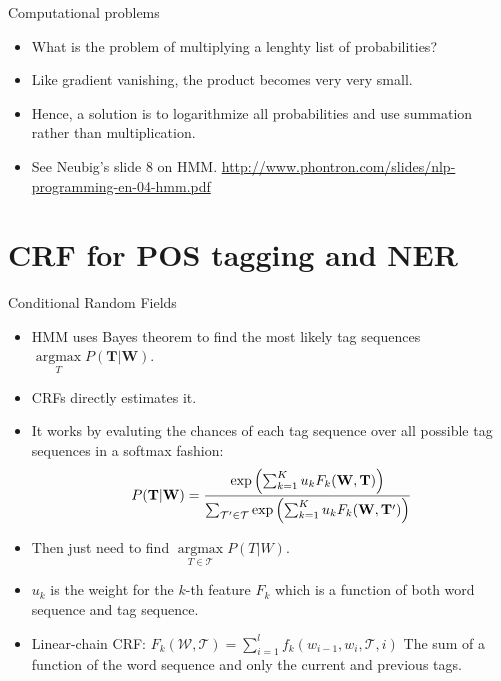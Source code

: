 \documentclass[11pt]{beamer}
\newcommand{\argmaxF}{\mathop{\mathrm{argmax}}\limits}
\begin{document}
\begin{frame}{Computational problems}
  \begin{itemize}[<+->]
    \item What is the problem of multiplying a lenghty list of probabilities? 
    \item Like gradient vanishing, the product becomes very very small. 
    \item Hence, a solution is to logarithmize all probabilities and use summation rather than multiplication.  
    \item See Neubig's slide 8 on HMM. \url{http://www.phontron.com/slides/nlp-programming-en-04-hmm.pdf} 
  \end{itemize}
\end{frame}

\section{CRF for POS tagging and NER}

\begin{frame}{Conditional Random Fields}
  \begin{itemize}[<+->]
    \item HMM uses Bayes theorem to find the most likely tag sequences $\argmaxF_T P(\mathbf{T}|\mathbf{W})$. 
    \item CRFs directly estimates it. 
    \item It works by evaluting the chances of each tag sequence over all possible tag sequences in a softmax fashion: 
    $$ P(\mathbf{T}|\mathbf{W}) = 
    {
    {\exp \left (  \sum_{k=1}^K u_k F_k(\mathbf{W}, \mathbf{T})  \right ) }
    \over
    {\sum_{\mathcal{T'} \in \mathcal{T}}
    \exp \left (  \sum_{k=1}^K u_k F_k(\mathbf{W}, \mathbf{T'})  \right ) }
    }
    $$
    \item Then just need to find $\argmaxF_{T\in \mathcal{T}} P(T|W)$. 
    \item $u_k$ is the weight for the $k$-th feature $F_k$ which is a function of both word sequence and tag sequence. 
    \item Linear-chain CRF: $F_k(\mathcal{W}, \mathcal{T}) = \sum_{i=1}^l f_k(w_{i-1}, w_i, \mathcal{T}, i)$ The sum of a function of the word sequence and only the current and previous tags. 
  \end{itemize}
\end{frame}
\end{document}
